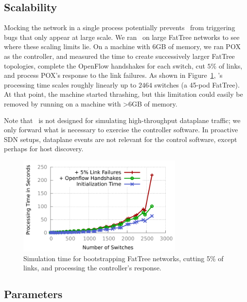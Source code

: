 
\subsection{Scalability}

Mocking the network in a single process potentially prevents \projectname~from
triggering bugs that only appear at large scale. We ran
\projectname~on large FatTree networks to see where these scaling limits lie.
On a machine with 6GB of memory, we ran POX as the controller, and measured the
time to create successively larger FatTree
topologies, complete the OpenFlow handshakes for each switch,
cut $5\%$ of links, and process POX's response to the link failures. As shown in
Figure~\ref{fig:scaling}, \projectname's processing time scales roughly
linearly up to $2464$ switches (a 45-pod FatTree). At that point, the machine
started thrashing, but this limitation could easily be removed by running on a
machine with >6GB of memory.

Note that \projectname~is not designed for simulating high-throughput dataplane
traffic; we only forward what is necessary to exercise the controller
software. In proactive SDN setups, dataplane events are not
relevant for the control software, except perhaps for host discovery.

\begin{figure}[t]
    \includegraphics[width=3.25in]{../graphs/scalability/scaling.pdf}
    \caption[]{\label{fig:scaling} Simulation time for bootstrapping FatTree
    networks, cutting 5\% of links, and processing the controller's response.}
\end{figure}

\subsection{Parameters}
\label{subsec:params}

